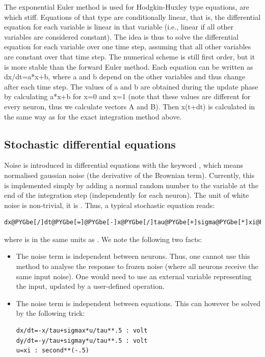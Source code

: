 \documentclass[letterpaper,10pt]{manual}
\begin{document}
The exponential Euler method is used for Hodgkin-Huxley type
equations, are which stiff.
Equations of that type are conditionally linear, that is, the differential equation
for each variable is linear in that variable (i.e., linear if all other variables
are considered constant).
The idea is thus to solve the differential equation for each variable over one time step,
assuming that all other variables are constant over that time step. The numerical scheme
is still first order, but it is more stable than the forward Euler method.
Each equation can be written as dx/dt=a*x+b, where a and b depend on the other variables
and thus change after each time step.
The values of a and b are obtained during the update phase by calculating a*x+b for x=0 and x=1
(note that these values are different for every neuron, thus we calculate vectors A and B).
Then x(t+dt) is calculated in the same way as for the exact integration method above.

\subsection{Stochastic differential equations}

Noise is introduced in differential equations with the keyword
, which means normalised gaussian noise (the derivative of the Brownian term).
Currently, this is implemented simply by adding a normal random number to the variable
at the end of the integration step (independently for each neuron).
The unit of white noise is non-trivial, it is . Thus, a typical stochastic
equation reads:

\begin{Verbatim}[commandchars=@\[\]]
dx@PYGbe[/]dt@PYGbe[=]@PYGbe[-]x@PYGbe[/]tau@PYGbe[+]sigma@PYGbe[*]xi@PYGbe[/]tau@PYGbe[*]@PYGbe[*]@PYGbe[.]@PYGaw[5]
\end{Verbatim}

where  is in the same units as . We note the following two facts:
\begin{itemize}
\item {} 
The noise term is independent between neurons. Thus, one cannot use this method to analyse
the response to frozen noise (where all neurons receive the same input noise). One would need
to use an external variable representing the input, updated by a user-defined operation.

\item {} 
The noise term is independent between equations. This can however be solved by the following
trick:

\begin{Verbatim}[commandchars=@\[\]]
dx/dt=-x/tau+sigmax*u/tau**.5 : volt
dy/dt=-y/tau+sigmay*u/tau**.5 : volt
u=xi : second**(-.5)
\end{Verbatim}

\end{itemize}
\end{document}
